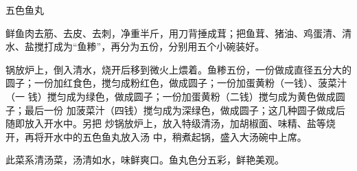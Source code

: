 %
%
%
%
%
%
%
\begin{recipe}[五福鱼丸]{五色鱼丸}

\ingredients


\preparation

\step 鲜鱼肉去筋、去皮、去刺，净重半斤，用刀背捶成茸；把鱼茸、猪油、鸡蛋清、清
水、盐搅打成为“鱼糁”，再分为五份，分别用五个小碗装好。

\step 锅放炉上，倒入清水，烧开后移到微火上煨着。鱼糁五份，一份做成直径五分大的
圆子；一份加红食色，搅匀成粉红色，做成圆子；一份加蛋黄粉（一钱）、菠菜汁（一
钱）搅匀成为绿色，做成圆子；一份加蛋黄粉（二钱）搅匀成为黄色做成圆子；最后一份
加菠菜汁（四钱）搅匀成为深绿色，做成圆子；这几种圆子做成后随即放入开水中。另把
炒锅放炉上，放入特级清汤，加胡椒面、味精、盐等烧开，再将开水中的五色鱼丸放入汤
中，稍煮起锅，盛入大汤碗中上席。

\features

此菜系清汤菜，汤清如水，味鲜爽口。鱼丸色分五彩，鲜艳美观。

\end{recipe}

